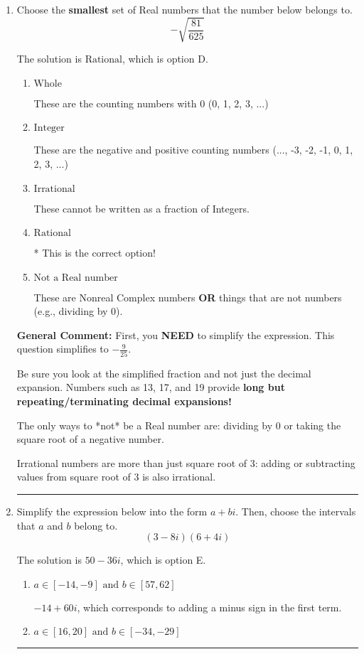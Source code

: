 \documentclass{extbook}[14pt]
\newcommand{\litem}[1]{\item #1

\rule{\textwidth}{0.4pt}}
\begin{document}
\begin{enumerate}\litem{
Choose the \textbf{smallest} set of Real numbers that the number below belongs to.
\[ -\sqrt{\frac{81}{625}} \]

The solution is \( \text{Rational} \), which is option D.\begin{enumerate}[label=\Alph*.]
\item \( \text{Whole} \)

These are the counting numbers with 0 (0, 1, 2, 3, ...)
\item \( \text{Integer} \)

These are the negative and positive counting numbers (..., -3, -2, -1, 0, 1, 2, 3, ...)
\item \( \text{Irrational} \)

These cannot be written as a fraction of Integers.
\item \( \text{Rational} \)

* This is the correct option!
\item \( \text{Not a Real number} \)

These are Nonreal Complex numbers \textbf{OR} things that are not numbers (e.g., dividing by 0).
\end{enumerate}

\textbf{General Comment:} First, you \textbf{NEED} to simplify the expression. This question simplifies to $-\frac{9}{25}$. 
 
 Be sure you look at the simplified fraction and not just the decimal expansion. Numbers such as 13, 17, and 19 provide \textbf{long but repeating/terminating decimal expansions!} 
 
 The only ways to *not* be a Real number are: dividing by 0 or taking the square root of a negative number. 
 
 Irrational numbers are more than just square root of 3: adding or subtracting values from square root of 3 is also irrational.
}
\litem{
Simplify the expression below into the form $a+bi$. Then, choose the intervals that $a$ and $b$ belong to.
\[ (3 - 8 i)(6 + 4 i) \]

The solution is \( 50 - 36 i \), which is option E.\begin{enumerate}[label=\Alph*.]
\item \( a \in [-14, -9] \text{ and } b \in [57, 62] \)

 $-14 + 60 i$, which corresponds to adding a minus sign in the first term.
\item \( a \in [16, 20] \text{ and } b \in [-34, -29] \)


\end{enumerate}}
\end{enumerate}
\end{document}
